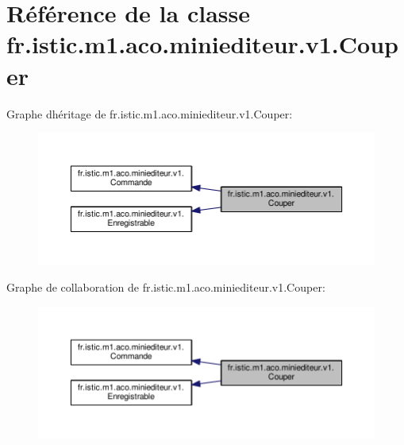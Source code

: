 \hypertarget{classfr_1_1istic_1_1m1_1_1aco_1_1miniediteur_1_1v1_1_1Couper}{}\section{Référence de la classe fr.\+istic.\+m1.\+aco.\+miniediteur.\+v1.\+Couper}
\label{classfr_1_1istic_1_1m1_1_1aco_1_1miniediteur_1_1v1_1_1Couper}


Graphe d\textquotesingle{}héritage de fr.\+istic.\+m1.\+aco.\+miniediteur.\+v1.\+Couper\+:
\nopagebreak
\begin{figure}[H]
\begin{center}
\leavevmode
\includegraphics[width=350pt]{classfr_1_1istic_1_1m1_1_1aco_1_1miniediteur_1_1v1_1_1Couper__inherit__graph}
\end{center}
\end{figure}


Graphe de collaboration de fr.\+istic.\+m1.\+aco.\+miniediteur.\+v1.\+Couper\+:
\nopagebreak
\begin{figure}[H]
\begin{center}
\leavevmode
\includegraphics[width=350pt]{classfr_1_1istic_1_1m1_1_1aco_1_1miniediteur_1_1v1_1_1Couper__coll__graph}
\end{center}
\end{figure}
